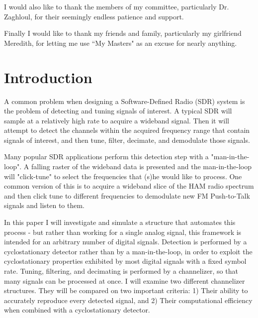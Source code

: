 \documentclass[12pt]{report}
\begin{document}
I would also like to thank the members of my committee, particularly Dr.
Zaghloul, for their seemingly endless patience and support.

Finally I would like to thank my friends and family, particularly my girlfriend
Meredith, for letting me use ``My Masters" as an excuse for nearly anything.

\tableofcontents
\pagebreak

\listoffigures
\pagebreak


\pagestyle{myheadings}

\chapter{Introduction}
\label{sec:intro}

A common problem when designing a Software-Defined Radio (SDR) system is the
problem of detecting and tuning signals of interest. A typical SDR will sample
at a relatively high rate to acquire a wideband signal. Then it will attempt to
detect the channels within the acquired frequency range that contain signals of
interest, and then tune, filter, decimate, and demodulate those signals. 

Many popular SDR applications perform this detection step with
a "man-in-the-loop".  A falling raster of the wideband data is presented and
the man-in-the-loop will "click-tune" to select  the frequencies that (s)he
would like to process. One common version of this is to acquire a wideband
slice of the HAM radio spectrum and then click tune to different frequencies to
demodulate new FM Push-to-Talk signals and listen to them.

In this paper I will investigate and simulate a structure that automates this
process - but rather than working for a single analog signal, this framework is
intended for an arbitrary number of digital signals. Detection is performed by
a cyclostationary detector rather than by a man-in-the-loop, in order to
exploit the cyclostationary properties exhibited by most digital signals with
a fixed symbol rate.  Tuning, filtering, and decimating is performed by
a channelizer, so that many signals can be processed at once.  I will examine
two different channelizer structures. They will be compared on two important
criteria:
1) Their ability to accurately reproduce every detected signal, and 2) Their
computational efficiency when combined with a cyclostationary detector.
\end{document}

